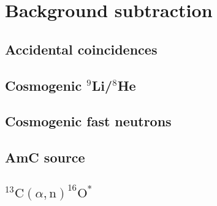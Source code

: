 \documentclass[../thesis.tex]{subfiles}
\begin{document}
\chapter{Background subtraction}
\label{chap:bkg}

\section{Accidental coincidences}

\section{Cosmogenic $^9$Li/$^8$He}

\section{Cosmogenic fast neutrons}

\section{AmC source}

\section{$^{13}\mathrm{C}(\alpha, \mathrm{n})^{16}\mathrm{O}^*$}
\end{document}

